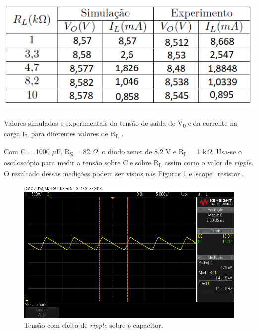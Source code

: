 \documentclass[journal, a4paper]{IEEEtran}
\begin{document}
	\begin{table}[H]
		\begin{center}
		\includegraphics[width=\columnwidth]{Tabela1.png}
		\caption{Valores simulados e experimentais da tensão de saída de V\textsubscript{0} e da corrente na carga I\textsubscript{L} para diferentes valores de R\textsubscript{L} .}
		\label{Tabela1}
		\end{center}
	\end{table}
    
    Com C = 1000 $\mu$F, R\textsubscript{S} = 82 $\Omega$, o diodo zener de 8,2 V e R\textsubscript{L} = 1 k$\Omega$. Usa-se o osciloscópio para medir a tensão sobre C e sobre R\textsubscript{L} assim como o valor de \textit{ripple}. O resultado dessas medições podem ser vistos nas Figuras \ref{scope_capacitor} e \ref{scope_resistor}.
    
     \begin{figure}[H]
		\begin{center}
		\includegraphics[width=\columnwidth]{scope_1_capacitor.png}
		\caption{Tensão com efeito de \textit{ripple} sobre o capacitor.}
		\label{scope_capacitor}
		\end{center}
	\end{figure}
    
\end{document}
